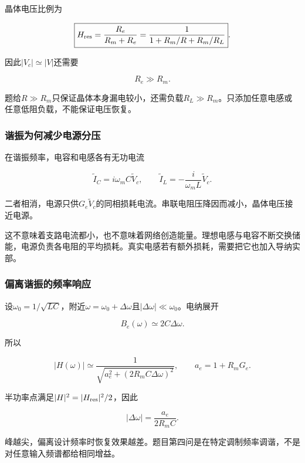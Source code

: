 \documentclass[12pt,a4paper,fontset=fandol]{ctexart}
\begin{document}
晶体电压比例为

\[
\boxed{
H_{\rm res}=\frac{R_e}{R_m+R_e}
=\frac1{1+R_m/R+R_m/R_L}}.
\]

因此\(|V_c|\simeq|V|\)还需要

\[
\boxed{R_e\gg R_m}.
\]

题给\(R\gg R_m\)只保证晶体本身漏电较小，还需负载\(R_L\gg R_m\)。只添加任意电感或任意低阻负载，不能保证电压恢复。

\subsubsection{谐振为何减少电源分压}\label{ux8c10ux632fux4e3aux4f55ux51cfux5c11ux7535ux6e90ux5206ux538b}

在谐振频率，电容和电感各有无功电流

\[
\widetilde I_C=i\omega_mC\widetilde V_c,\qquad
\widetilde I_L=-\frac{i}{\omega_mL}\widetilde V_c.
\]

二者相消，电源只供\(G_e\widetilde V_c\)的同相损耗电流。串联电阻压降因而减小，晶体电压接近电源。

这不意味着支路电流都小，也不意味着网络创造能量。理想电感与电容不断交换储能，电源负责各电阻的平均损耗。真实电感若有额外损耗，需要把它也加入导纳实部。

\subsubsection{偏离谐振的频率响应}\label{ux504fux79bbux8c10ux632fux7684ux9891ux7387ux54cdux5e94}

设\(\omega_0=1/\sqrt{LC}\)，附近\(\omega=\omega_0+\Delta\omega\)且\(|\Delta\omega|\ll\omega_0\)。电纳展开

\[
B_e(\omega)\simeq2C\Delta\omega.
\]

所以

\[
|H(\omega)|
\simeq
\frac1{\sqrt{a_e^2+(2R_mC\Delta\omega)^2}},
\qquad a_e=1+R_mG_e.
\]

半功率点满足\(|H|^2=|H_{\rm res}|^2/2\)，因此

\[
|\Delta\omega|=\frac{a_e}{2R_mC}.
\]

峰越尖，偏离设计频率时恢复效果越差。题目第四问是在特定调制频率调谐，不是对任意输入频谱都给相同增益。
\end{document}
